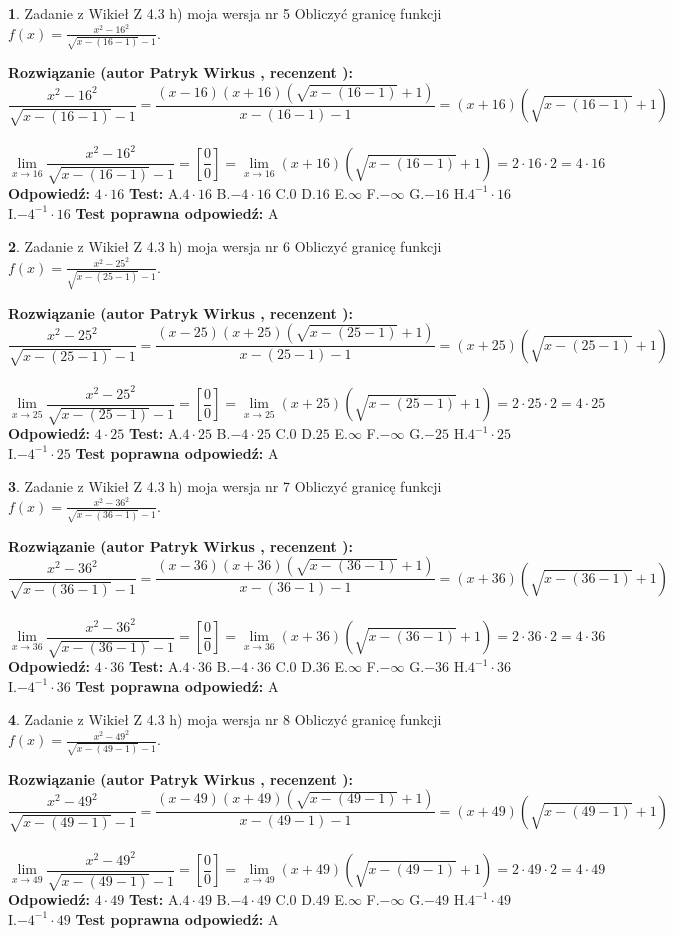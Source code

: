 \documentclass[12pt, a4paper]{article}
\theoremstyle{definition} %
\newtheorem{zad}{}
\newcommand{\zadStart}[1]{\begin{zad}#1\newline}
\newcommand{\zadStop}{\end{zad}}
\newcommand{\rozwStart}[2]{\noindent \textbf{Rozwiązanie (autor #1 , recenzent #2): }\newline}
\newcommand{\rozwStop}{\newline}
\newcommand{\odpStart}{\noindent \textbf{Odpowiedź:}\newline}
\newcommand{\odpStop}{\newline}
\newcommand{\testStart}{\noindent \textbf{Test:}\newline}
\newcommand{\testStop}{\newline}
\newcommand{\kluczStart}{\noindent \textbf{Test poprawna odpowiedź:}\newline}
\newcommand{\kluczStop}{\newline}
\begin{document}
\zadStart{Zadanie z Wikieł Z 4.3 h) moja wersja nr 5}
Obliczyć granicę funkcji $f(x)=\frac{x^{2} - 16^{2}}{\sqrt{x-(16-1)}-1}$.
\zadStop
\rozwStart{Patryk Wirkus}{}
$$\frac{x^{2} - 16^{2}}{\sqrt{x-(16-1)}-1}=\frac{(x-16)(x+16)(\sqrt{x-(16-1)}+1)}{x-(16-1)-1}=(x+16)(\sqrt{x-(16-1)}+1)$$
\\
$$\lim\limits_{x\to 16}\frac{x^{2} - 16^{2}}{\sqrt{x-(16-1)}-1}=[\frac{0}{0}]=
\lim\limits_{x\to 16}(x+16)(\sqrt{x-(16-1)}+1) = 2\cdot16 \cdot 2 = 4 \cdot 16$$
\rozwStop
\odpStart
$4\cdot16$
\odpStop
\testStart
A.$4\cdot16$
B.$-4\cdot16$
C.$0$
D.$16$
E.$\infty$
F.$-\infty$
G.$-16$
H.$4^{-1}\cdot16$
I.$-4^{-1}\cdot16$
\testStop
\kluczStart
A
\kluczStop



\zadStart{Zadanie z Wikieł Z 4.3 h) moja wersja nr 6}
Obliczyć granicę funkcji $f(x)=\frac{x^{2} - 25^{2}}{\sqrt{x-(25-1)}-1}$.
\zadStop
\rozwStart{Patryk Wirkus}{}
$$\frac{x^{2} - 25^{2}}{\sqrt{x-(25-1)}-1}=\frac{(x-25)(x+25)(\sqrt{x-(25-1)}+1)}{x-(25-1)-1}=(x+25)(\sqrt{x-(25-1)}+1)$$
\\
$$\lim\limits_{x\to 25}\frac{x^{2} - 25^{2}}{\sqrt{x-(25-1)}-1}=[\frac{0}{0}]=
\lim\limits_{x\to 25}(x+25)(\sqrt{x-(25-1)}+1) = 2\cdot25 \cdot 2 = 4 \cdot 25$$
\rozwStop
\odpStart
$4\cdot25$
\odpStop
\testStart
A.$4\cdot25$
B.$-4\cdot25$
C.$0$
D.$25$
E.$\infty$
F.$-\infty$
G.$-25$
H.$4^{-1}\cdot25$
I.$-4^{-1}\cdot25$
\testStop
\kluczStart
A
\kluczStop



\zadStart{Zadanie z Wikieł Z 4.3 h) moja wersja nr 7}
Obliczyć granicę funkcji $f(x)=\frac{x^{2} - 36^{2}}{\sqrt{x-(36-1)}-1}$.
\zadStop
\rozwStart{Patryk Wirkus}{}
$$\frac{x^{2} - 36^{2}}{\sqrt{x-(36-1)}-1}=\frac{(x-36)(x+36)(\sqrt{x-(36-1)}+1)}{x-(36-1)-1}=(x+36)(\sqrt{x-(36-1)}+1)$$
\\
$$\lim\limits_{x\to 36}\frac{x^{2} - 36^{2}}{\sqrt{x-(36-1)}-1}=[\frac{0}{0}]=
\lim\limits_{x\to 36}(x+36)(\sqrt{x-(36-1)}+1) = 2\cdot36 \cdot 2 = 4 \cdot 36$$
\rozwStop
\odpStart
$4\cdot36$
\odpStop
\testStart
A.$4\cdot36$
B.$-4\cdot36$
C.$0$
D.$36$
E.$\infty$
F.$-\infty$
G.$-36$
H.$4^{-1}\cdot36$
I.$-4^{-1}\cdot36$
\testStop
\kluczStart
A
\kluczStop



\zadStart{Zadanie z Wikieł Z 4.3 h) moja wersja nr 8}
Obliczyć granicę funkcji $f(x)=\frac{x^{2} - 49^{2}}{\sqrt{x-(49-1)}-1}$.
\zadStop
\rozwStart{Patryk Wirkus}{}
$$\frac{x^{2} - 49^{2}}{\sqrt{x-(49-1)}-1}=\frac{(x-49)(x+49)(\sqrt{x-(49-1)}+1)}{x-(49-1)-1}=(x+49)(\sqrt{x-(49-1)}+1)$$
\\
$$\lim\limits_{x\to 49}\frac{x^{2} - 49^{2}}{\sqrt{x-(49-1)}-1}=[\frac{0}{0}]=
\lim\limits_{x\to 49}(x+49)(\sqrt{x-(49-1)}+1) = 2\cdot49 \cdot 2 = 4 \cdot 49$$
\rozwStop
\odpStart
$4\cdot49$
\odpStop
\testStart
A.$4\cdot49$
B.$-4\cdot49$
C.$0$
D.$49$
E.$\infty$
F.$-\infty$
G.$-49$
H.$4^{-1}\cdot49$
I.$-4^{-1}\cdot49$
\testStop
\kluczStart
A
\kluczStop
\end{document}
